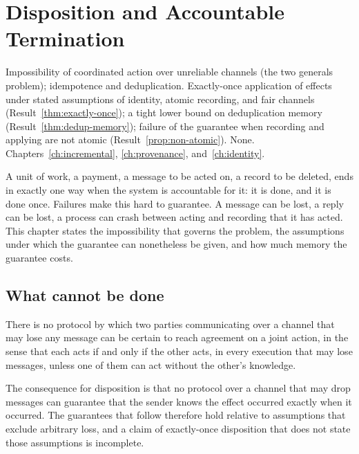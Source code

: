 \chapter{Disposition and Accountable Termination}\label{ch:disposition}
{Impossibility of coordinated action over unreliable channels (the two generals problem); idempotence and deduplication.}
{Exactly-once application of effects under stated assumptions of identity, atomic recording, and fair channels (Result~\ref{thm:exactly-once}); a tight lower bound on deduplication memory (Result~\ref{thm:dedup-memory}); failure of the guarantee when recording and applying are not atomic (Result~\ref{prop:non-atomic}).}
{None.}
{Chapters~\ref{ch:incremental}, \ref{ch:provenance}, and~\ref{ch:identity}.}

A unit of work, a payment, a message to be acted on, a record to be deleted, ends in exactly one way when the system is accountable for it: it is done, and it is done once. Failures make this hard to guarantee. A message can be lost, a reply can be lost, a process can crash between acting and recording that it has acted. This chapter states the impossibility that governs the problem, the assumptions under which the guarantee can nonetheless be given, and how much memory the guarantee costs.

\section{What cannot be done}

\begin{established}\label{thm:two-generals}
There is no protocol by which two parties communicating over a channel that may lose any message can be certain to reach agreement on a joint action, in the sense that each acts if and only if the other acts, in every execution that may lose messages, unless one of them can act without the other's knowledge.
\end{established}

The consequence for disposition is that no protocol over a channel that may drop messages can guarantee that the sender knows the effect occurred exactly when it occurred. The guarantees that follow therefore hold relative to assumptions that exclude arbitrary loss, and a claim of exactly-once disposition that does not state those assumptions is incomplete.

